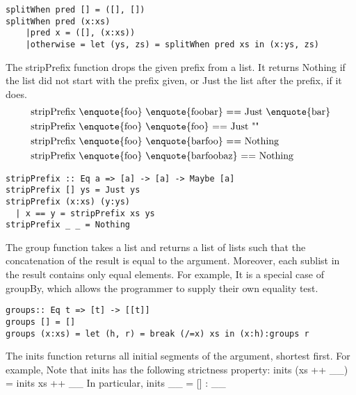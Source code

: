 \eqCode
\begin{lstlisting}[frame=single]
splitWhen pred [] = ([], [])
splitWhen pred (x:xs)
	|pred x = ([], (x:xs))
	|otherwise = let (ys, zs) = splitWhen pred xs in (x:ys, zs)
\end{lstlisting}

The stripPrefix function drops the given prefix from a list. It returns Nothing if the list did not start with the prefix given, or Just the list after the prefix, if it does.
\begin{align*}
	&\text{stripPrefix \enquote{foo} \enquote{foobar} == Just \enquote{bar}}\\
	&\text{stripPrefix \enquote{foo} \enquote{foo} == Just ""}\\
	&\text{stripPrefix \enquote{foo} \enquote{barfoo} == Nothing}\\
	&\text{stripPrefix \enquote{foo} \enquote{barfoobaz} == Nothing}
\end{align*}

\checkImpl
\begin{lstlisting}[frame=single]
stripPrefix :: Eq a => [a] -> [a] -> Maybe [a]
stripPrefix [] ys = Just ys
stripPrefix (x:xs) (y:ys)
  | x == y = stripPrefix xs ys
stripPrefix _ _ = Nothing
\end{lstlisting}

The group function takes a list and returns a list of lists such that the concatenation of the result is equal to the argument. Moreover, each sublist in the result contains only equal elements. For example,
It is a special case of groupBy, which allows the programmer to supply their own equality test.

\eqCode
\label{haskellBreak}
\begin{lstlisting}[frame=single]
groups:: Eq t => [t] -> [[t]]
groups [] = []
groups (x:xs) = let (h, r) = break (/=x) xs in (x:h):groups r
\end{lstlisting}

The inits function returns all initial segments of the argument, shortest first. For example,
Note that inits has the following strictness property: inits (xs ++ \_\textbar\_) = inits xs ++ \_\textbar\_
In particular, inits \_\textbar\_ = [] : \_\textbar\_

